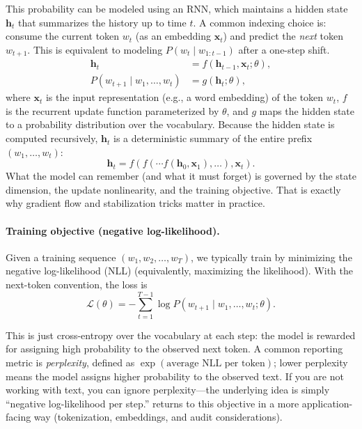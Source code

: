This probability can be modeled using an RNN, which maintains a hidden state \( \mathbf{h}_t \) that summarizes the history up to time \( t \). A common indexing choice is: consume the current token \(w_t\) (as an embedding \(\mathbf{x}_t\)) and predict the \emph{next} token \(w_{t+1}\). This is equivalent to modeling \(P(w_t\mid w_{1: t-1})\) after a one-step shift.
\begin{equation}
\begin{aligned}
    \mathbf{h}_t &= f(\mathbf{h}_{t-1}, \mathbf{x}_t; \theta), \\
    P(w_{t+1} \mid w_1, \ldots, w_t) &= g(\mathbf{h}_t; \theta),
\end{aligned}
\label{eq:rnn_output_prob}
\end{equation}
where \( \mathbf{x}_t \) is the input representation (e.g., a word embedding) of the token \( w_t \), \( f \) is the recurrent update function parameterized by \(\theta\), and \( g \) maps the hidden state to a probability distribution over the vocabulary. Because the hidden state is computed recursively, \(\mathbf{h}_t\) is a deterministic summary of the entire prefix \((w_1,\ldots,w_t)\):
\[
\mathbf{h}_t=f(f(\cdots f(\mathbf{h}_0,\mathbf{x}_1),\ldots),\mathbf{x}_t).
\]
What the model can remember (and what it must forget) is governed by the state dimension, the update nonlinearity, and the training objective. That is exactly why gradient flow and stabilization tricks matter in practice.

\paragraph{Training objective (negative log-likelihood).}
Given a training sequence \( (w_1, w_2, \ldots, w_T) \), we typically train by minimizing the negative log-likelihood (NLL) (equivalently, maximizing the likelihood). With the next-token convention, the loss is
\begin{equation}
    \mathcal{L}(\theta) = -\sum_{t=1}^{T-1} \log P(w_{t+1} \mid w_1, \ldots, w_t; \theta).
\label{eq:rnn_next_token_nll}
\end{equation}

This is just cross-entropy over the vocabulary at each step: the model is rewarded for assigning high probability to the observed next token. A common reporting metric is \emph{perplexity}, defined as \(\exp(\text{average NLL per token})\); lower perplexity means the model assigns higher probability to the observed text. If you are not working with text, you can ignore perplexity---the underlying idea is simply ``negative log-likelihood per step.''  returns to this objective in a more application-facing way (tokenization, embeddings, and audit considerations).

